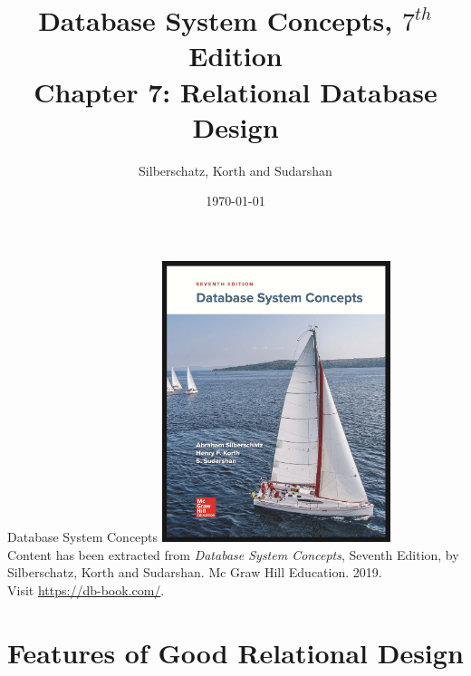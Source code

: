\documentclass{beamer}
\title[Chapter 7]{Database System Concepts, $7^{th}$ Edition \\ Chapter 7: Relational Database Design}
\author{Silberschatz, Korth and Sudarshan}
\date{\today}
\begin{document}
\frame{\titlepage}

\begin{frame}{Database System Concepts}
    \centering
    \includegraphics[width=0.5\textwidth]{figures/book_cover.jpg} \\
    \vspace{5mm}
    {
        \tiny
        Content has been extracted from \textit{Database System Concepts}, Seventh Edition, by Silberschatz, Korth and Sudarshan. Mc Graw Hill Education. 2019.\\
        Visit \url{https://db-book.com/}.\\
    }
\end{frame}

\section{Features of Good Relational Design}
\end{document}
